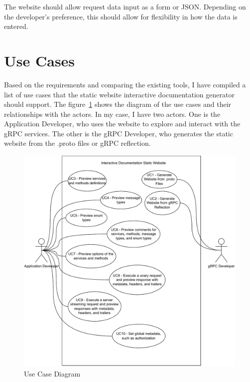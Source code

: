 The website should allow request data input as a form or JSON\@.
Depending on the developer's preference, this should allow for flexibility in how the data is entered.


\section{Use Cases}
Based on the requirements and comparing the existing tools, I have compiled a list of use cases that the static website interactive documentation generator should support.
The figure~\ref{fig:use-case-diagram} shows the diagram of the use cases and their relationships with the actors.
In my case, I have two actors.
One is the Application Developer, who uses the website to explore and interact with the gRPC services.
The other is the gRPC Developer, who generates the static website from the .proto files or gRPC reflection.

\begin{figure}
    \centering
    \captionsetup{justification=centering}
    \includegraphics[width=1.0\textwidth]{images/use-case-diagram}
    \caption{Use Case Diagram}
    \label{fig:use-case-diagram}
\end{figure}


\newcommand{\usecase}[2]{%
    \stepcounter{uccounter}%
    \subsection{UC\arabic{uccounter} -- #1}
}


